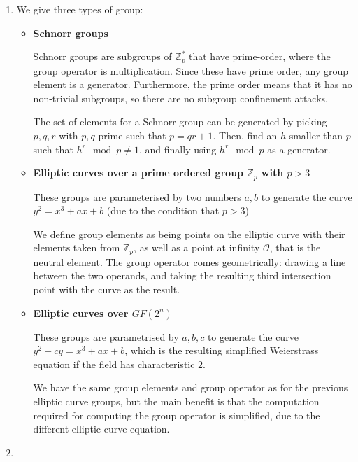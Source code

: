 


\begin{enumerate}[label=(\alph*)]
  \item
    We give three types of group:

    \begin{itemize}
      \item
        \textbf{Schnorr groups}

        Schnorr groups are subgroups of $\mathbb{Z}^*_p$ that have prime-order, where the group operator is multiplication. Since these have prime order, any group element is a generator. Furthermore, the prime order means that it has no non-trivial subgroups, so there are no subgroup confinement attacks.

        The set of elements for a Schnorr group can be generated by picking $p,q,r$ with $p,q$ prime such that $p = qr + 1$. Then, find an $h$ smaller than $p$ such that $h^r \mod{p} \neq 1$, and finally using $h^r \mod{p}$ as a generator.

      \item
        \textbf{Elliptic curves over a prime ordered group $\mathbb{Z}_p$ with $p > 3$}

        These groups are parameterised by two numbers $a,b$ to generate the curve $y^2 = x^3 + ax + b$ (due to the condition that $p > 3$)

        We define group elements as being points on the elliptic curve with their elements taken from $\mathbb{Z}_p$, as well as a point at infinity $\mathcal{O}$, that is the neutral element. The group operator comes geometrically: drawing a line between the two operands, and taking the resulting third intersection point with the curve as the result.

      \item
        \textbf{Elliptic curves over $GF(2^n)$}

        These groups are parametrised by $a,b,c$ to generate the curve $y^2 + cy = x^3 + ax + b$, which is the resulting simplified Weierstrass equation if the field has characteristic $2$.

        We have the same group elements and group operator as for the previous elliptic curve groups, but the main benefit is that the computation required for computing the group operator is simplified, due to the different elliptic curve equation.


    \end{itemize}

  \item
    \begin{enumerate}[label=(\roman*)]


\end{enumerate}
\end{enumerate}

